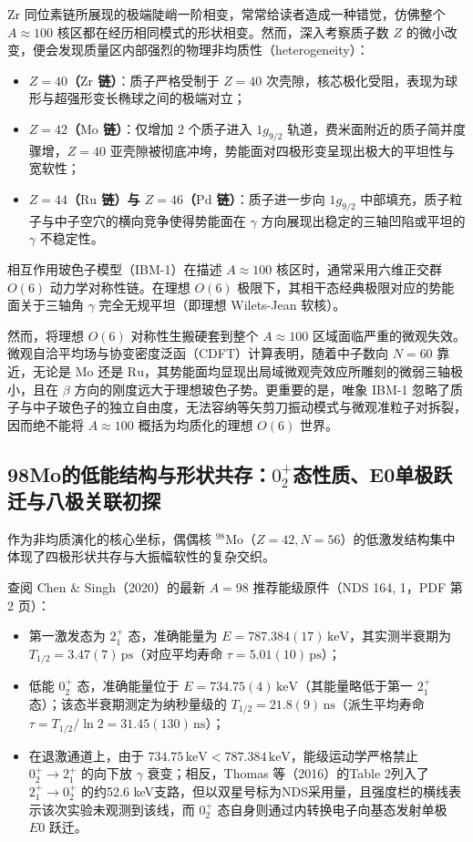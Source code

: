 Zr 同位素链所展现的极端陡峭一阶相变，常常给读者造成一种错觉，仿佛整个 $A\approx 100$ 核区都在经历相同模式的形状相变。然而，深入考察质子数 $Z$ 的微小改变，便会发现质量区内部强烈的物理非均质性（heterogeneity）：
\begin{itemize}
\item \textbf{$Z=40$（$\mathrm{Zr}$ 链）}：质子严格受制于 $Z=40$ 次壳隙，核芯极化受阻，表现为球形与超强形变长椭球之间的极端对立；
\item \textbf{$Z=42$（$\mathrm{Mo}$ 链）}：仅增加 2 个质子进入 $1g_{9/2}$ 轨道，费米面附近的质子简并度骤增，$Z=40$ 亚壳隙被彻底冲垮，势能面对四极形变呈现出极大的平坦性与宽软性；
\item \textbf{$Z=44$（$\mathrm{Ru}$ 链）与 $Z=46$（$\mathrm{Pd}$ 链）}：质子进一步向 $1g_{9/2}$ 中部填充，质子粒子与中子空穴的横向竞争使得势能面在 $\gamma$ 方向展现出稳定的三轴凹陷或平坦的 $\gamma$ 不稳定性。
\end{itemize}

相互作用玻色子模型（IBM-1）在描述 $A\approx 100$ 核区时，通常采用六维正交群 $O(6)$ 动力学对称性链。在理想 $O(6)$ 极限下，其相干态经典极限对应的势能面关于三轴角 $\gamma$ 完全无规平坦（即理想 Wilets-Jean 软核）。

然而，将理想 $O(6)$ 对称性生搬硬套到整个 $A\approx 100$ 区域面临严重的微观失效。微观自洽平均场与协变密度泛函（CDFT）计算表明，随着中子数向 $N=60$ 靠近，无论是 $\mathrm{Mo}$ 还是 $\mathrm{Ru}$，其势能面均显现出局域微观壳效应所雕刻的微弱三轴极小，且在 $\beta$ 方向的刚度远大于理想玻色子势。更重要的是，唯象 IBM-1 忽略了质子与中子玻色子的独立自由度，无法容纳等矢剪刀振动模式与微观准粒子对拆裂，因而绝不能将 $A\approx 100$ 概括为均质化的理想 $O(6)$ 世界。

\subsection{98Mo的低能结构与形状共存：$0^+_2$态性质、E0单极跃迁与八极关联初探}\label{sec:4-3-3}

作为非均质演化的核心坐标，偶偶核 $^{98}\mathrm{Mo}$（$Z=42, N=56$）的低激发结构集中体现了四极形状共存与大振幅软性的复杂交织。

查阅 Chen \& Singh（2020）\cite{chen-singh-2020-nds-98mo}的最新 $A=98$ 推荐能级原件（NDS 164, 1，PDF 第 2 页）：
\begin{itemize}
\item 第一激发态为 $2^+_1$ 态，准确能量为 $E = 787.384(17)\,\mathrm{keV}$，其实测半衰期为 $T_{1/2} = 3.47(7)\,\mathrm{ps}$（对应平均寿命 $\tau = 5.01(10)\,\mathrm{ps}$）；
\item 低能 $0^+_2$ 态，准确能量位于 $E = 734.75(4)\,\mathrm{keV}$（其能量略低于第一 $2^+_1$ 态）；该态半衰期测定为纳秒量级的 $T_{1/2} = 21.8(9)\,\mathrm{ns}$（派生平均寿命 $\tau = T_{1/2}/\ln 2 = 31.45(130)\,\mathrm{ns}$）；
\item 在退激通道上，由于 $734.75\,\mathrm{keV} < 787.384\,\mathrm{keV}$，能级运动学严格禁止 $0^+_2 \to 2^+_1$ 的向下放 $\gamma$ 衰变；相反，Thomas 等（2016）\cite{thomas-2016-96-98mo-coexistence}的Table 2列入了 $2^+_1\to0^+_2$ 的约52.6 keV支路，但以双星号标为NDS采用量，且强度栏的横线表示该次实验未观测到该线，而 $0^+_2$ 态自身则通过内转换电子向基态发射单极 $E0$ 跃迁。
\end{itemize}

